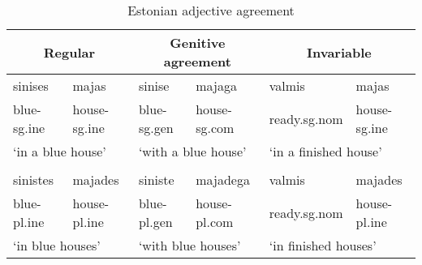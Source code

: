 \begin{table}[h]
\small
\begin{tabular}{ll | ll | ll}

\multicolumn{2}{c|}{\bf Regular} & \multicolumn{2}{c|}{\bf Genitive
                                   agreement} & \multicolumn{2}{c}{\bf
                                                Invariable} \\ \hline
 sinises & majas &  sinise & majaga &  valmis & majas \\
blue-{\sc sg.ine} & house-{\sc sg.ine} & blue-{\sc sg.gen} & house-{\sc sg.com} &  ready.{\sc sg.nom} & house-{\sc sg.ine} \\
\multicolumn{2}{l|}{`in a blue house'} & \multicolumn{2}{l|}{`with a blue house'} & \multicolumn{2}{l}{`in a finished house'} \\
 & & & & & \\
sinistes & majades & siniste & majadega & valmis & majades \\
blue-{\sc pl.ine} & house-{\sc pl.ine} & blue-{\sc pl.gen} & house-{\sc pl.com} & ready.{\sc sg.nom} & house-{\sc pl.ine} \\
\multicolumn{2}{l|}{`in blue houses'} & \multicolumn{2}{l|}{`with blue
                                         houses'} &
                                                     \multicolumn{2}{l}{`in finished houses'}

\end{tabular}
\caption{Estonian adjective agreement}
\label{estonian}
\end{table}



